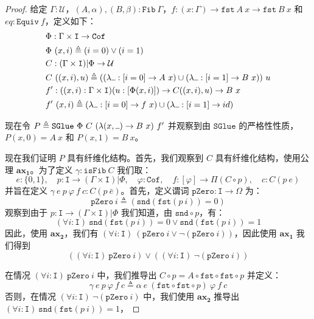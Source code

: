 \documentclass{ctexrep}
\theoremstyle{plain}
\theoremstyle{definition}
\theoremstyle{remark}
\newcommand\ttI{\mathtt{I}}
\newcommand{\ax}[1]{\mathbf{ax_{#1}}}
\newcommand{\ul}{{\rule[0ex]{0.5em}{0.4pt}}} %
\begin{document}
\begin{proof}
给定 $\Gamma : \mathcal{U}$，$(A, \alpha), (B, \beta) : \mathtt{Fib}\ \Gamma$，$f : (x : \Gamma) \to \mathtt{fst}\ A\ x \to \mathtt{fst}\ B\ x$ 和 $eq : \mathtt{Equiv}\ f$，定义如下：
\begin{align*}
&\Phi : \Gamma \times \ttI \to \mathtt{Cof}\\
&\Phi\ (x, i) \triangleq (i = 0) \lor (i = 1)\\
&C : (\Gamma \times \ttI)|\Phi \to \mathcal{U}\\
&C\ ((x, i), u) \triangleq ((\lambda\ul  : [i = 0] \to A\ x) \cup (\lambda\ul  : [i = 1] \to B\ x))\ u\\
&f' : ((x, i) : \Gamma \times \ttI)(u : [\Phi(x, i)]) \to C((x, i), u) \to B\ x\\
&f'\ (x, i) \triangleq (\lambda\ul  : [i = 0] \to f\ x) \cup (\lambda\ul  : [i = 1] \to  id )
\end{align*}

现在令 $P \triangleq \mathtt{SGlue}\ \Phi\ C\ (\lambda(x, \ul ) \to B\ x)\ f'$ 并观察到由 $\mathtt{SGlue}$ 的严格性性质，$P(x, 0) = A\ x$ 和 $P(x, 1) = B\ x$。

现在我们证明 $P$ 具有纤维化结构。首先，我们观察到 $C$ 具有纤维化结构，使用公理 $\ax{1}$。为了定义 $\gamma : \mathtt{isFib}\ C$ 我们取：
\[
e : \{0, 1\}, \quad p : \ttI \to (\Gamma \times \ttI)|\Phi, \quad \varphi : \mathtt{Cof}, \quad f : [\varphi] \to \Pi(C \circ p), \quad c : C(p\ e)
\]
并旨在定义 $\gamma\ e\ p\ \varphi\ f\ c : C(p\ \bar{e})$。首先，定义谓词 $\mathtt{pZero} : \ttI \to \Omega$ 为：
\[
\mathtt{pZero}\ i \triangleq (\mathtt{snd}(\mathtt{fst}(p\ i)) = 0)
\]
观察到由于 $p : \ttI \to (\Gamma \times \ttI)|\Phi$ 我们知道，由 $\mathtt{snd} \circ p$，有：
\begin{equation}
(\forall i : \ttI)\ \mathtt{snd}(\mathtt{fst}(p\ i)) = 0 \lor \mathtt{snd}(\mathtt{fst}(p\ i)) = 1
\end{equation}
因此，使用 $\ax{2}$，我们有 $(\forall i : \ttI)\ (\mathtt{pZero}\ i \lor \neg(\mathtt{pZero}\ i))$，因此使用 $\ax{1}$ 我们得到
\[
((\forall i : \ttI)\ \mathtt{pZero}\ i) \lor ((\forall i : \ttI)\ \neg(\mathtt{pZero}\ i))
\]

在情况 $(\forall i : \ttI)\ \mathtt{pZero}\ i$ 中，我们推导出 $C \circ p = A \circ \mathtt{fst} \circ \mathtt{fst} \circ p$ 并定义：
\[
\gamma\ e\ p\ \varphi\ f\ c \triangleq \alpha\ e\ (\mathtt{fst} \circ \mathtt{fst} \circ p)\ \varphi\ f\ c
\]
否则，在情况 $(\forall i : \ttI)\ \neg(\mathtt{pZero}\ i)$ 中，我们使用 $\ax{2}$ 推导出 $(\forall i : \ttI)\ \mathtt{snd}(\mathtt{fst}(p\ i)) = 1$，


\end{proof}
\end{document}
